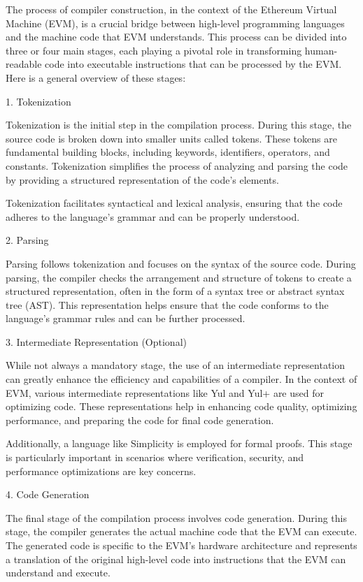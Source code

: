 The process of compiler construction, in the context of the Ethereum Virtual Machine (EVM), is a crucial bridge between high-level programming languages and the machine code that EVM understands. This process can be divided into three or four main stages, each playing a pivotal role in transforming human-readable code into executable instructions that can be processed by the EVM. Here is a general overview of these stages:

1. Tokenization

   Tokenization is the initial step in the compilation process. During this stage, the source code is broken down into smaller units called tokens. These tokens are fundamental building blocks, including keywords, identifiers, operators, and constants. Tokenization simplifies the process of analyzing and parsing the code by providing a structured representation of the code's elements.

   Tokenization facilitates syntactical and lexical analysis, ensuring that the code adheres to the language's grammar and can be properly understood.

2. Parsing

   Parsing follows tokenization and focuses on the syntax of the source code. During parsing, the compiler checks the arrangement and structure of tokens to create a structured representation, often in the form of a syntax tree or abstract syntax tree (AST). This representation helps ensure that the code conforms to the language's grammar rules and can be further processed.

3. Intermediate Representation (Optional)

   While not always a mandatory stage, the use of an intermediate representation can greatly enhance the efficiency and capabilities of a compiler. In the context of EVM, various intermediate representations like Yul and Yul+ are used for optimizing code. These representations help in enhancing code quality, optimizing performance, and preparing the code for final code generation.

   Additionally, a language like Simplicity is employed for formal proofs. This stage is particularly important in scenarios where verification, security, and performance optimizations are key concerns.

4. Code Generation

   The final stage of the compilation process involves code generation. During this stage, the compiler generates the actual machine code that the EVM can execute. The generated code is specific to the EVM's hardware architecture and represents a translation of the original high-level code into instructions that the EVM can understand and execute.

